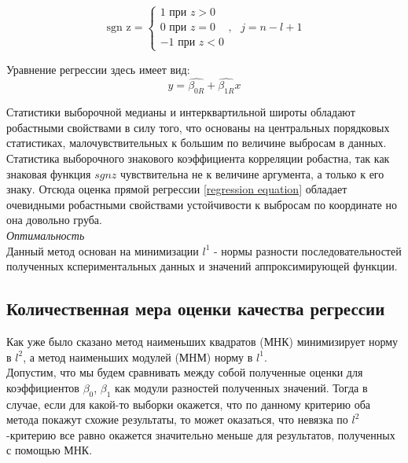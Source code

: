 \documentclass[a4paper]{article}
\begin{document}
     \begin{equation} \label{sgnz}
        \text{sgn z} = 
        \begin{cases}
            1 \text{ при } z > 0 \\
            0 \text{ при } z = 0\\
            -1 \text{ при } z < 0
        \end{cases}
        , \text{ } j = n - l + 1
    \end{equation}
    
    Уравнение регрессии здесь имеет вид: \\
    
    \begin{equation} \label{regression equation}
        y = \widehat{\beta_{0 R}} + \widehat{\beta_{1 R}} x
    \end{equation}
    
    Статистики выборочной медианы и интерквартильной широты обладают робастными свойствами в силу того, что основаны на центральных порядковых статистиках, малочувствительных к большим по величине выбросам в данных. Статистика выборочного знакового коэффициента корреляции робастна, так как знаковая функция $sgn z$ чувствительна не к величине аргумента, а только к его знаку. Отсюда оценка прямой регрессии \ref{regression equation} обладает очевидными робастными свойствами устойчивости к выбросам по координате но она довольно груба. \\
    
    \textit{Оптимальность} \\
    Данный метод основан на минимизации $l^1$ - нормы разности последовательностей полученных кспериментальных данных и значений аппроксимирующей функции.

    
    \subsection{Количественная мера оценки качества регрессии}
    
    Как уже было сказано метод наименьших квадратов (МНК) минимизирует норму в $l^{2}$, а метод наименьших модулей (МНМ) норму в $l^{1}$.\\
    
    Допустим, что мы будем сравнивать между собой полученные оценки для коэффициентов $\beta_0$, $\beta_1$ как модули разностей полученных значений. Тогда в случае, если для какой-то выборки окажется, что по данному критерию оба метода покажут схожие результаты, то может оказаться, что невязка по $l^{2}$-критерию все равно окажется значительно меньше для результатов, полученных с помощью МНК.\\
    
\end{document}
